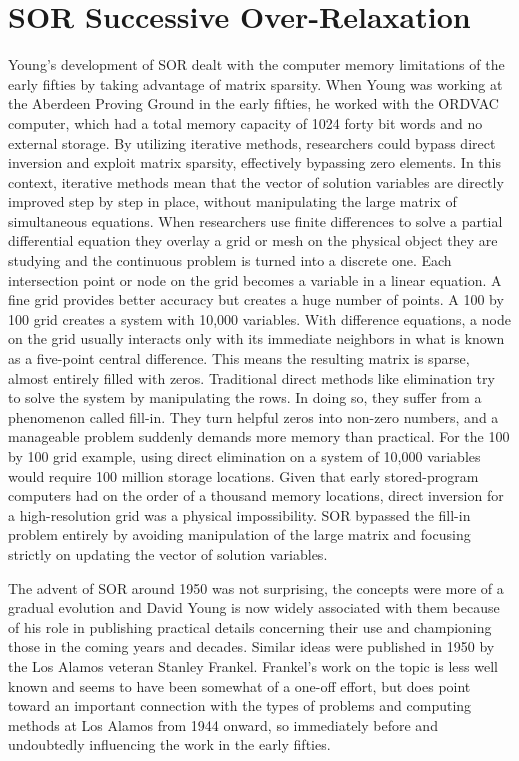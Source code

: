 \section{SOR Successive Over-Relaxation}

Young’s development of SOR dealt with the computer memory limitations of the early fifties by taking advantage of matrix sparsity. When Young was working at the Aberdeen Proving Ground in the early fifties, he worked with the ORDVAC computer, which had a total memory capacity of 1024 forty bit words and no external storage. By utilizing iterative methods, researchers could bypass direct inversion and exploit matrix sparsity, effectively bypassing zero elements. In this context, iterative methods mean that the vector of solution variables are directly improved step by step in place, without manipulating the large matrix of simultaneous equations. When researchers use finite differences to solve a partial differential equation they overlay a grid or mesh on the physical object they are studying and the continuous problem is turned into a discrete one. Each intersection point or node on the grid becomes a variable in a linear equation. A fine grid provides better accuracy but creates a huge number of points. A 100 by 100 grid creates a system with 10,000 variables. With difference equations, a node on the grid usually interacts only with its immediate neighbors in what is known as a five-point central difference. This means the resulting matrix is sparse, almost entirely filled with zeros. Traditional direct methods like elimination try to solve the system by manipulating the rows. In doing so, they suffer from a phenomenon called fill-in. They turn helpful zeros into non-zero numbers, and a manageable problem suddenly demands more memory than practical. For the 100 by 100 grid example, using direct elimination on a system of 10,000 variables would require 100 million storage locations. Given that early stored-program computers had on the order of a thousand memory locations, direct inversion for a high-resolution grid was a physical impossibility. SOR bypassed the fill-in problem entirely by avoiding manipulation of the large matrix and focusing strictly on updating the vector of solution variables. \cite{youngORDVACSolutionsDirichlet1955} \cite{forsytheComputerSolutionLinear1967}

The advent of SOR around 1950 was not surprising, the concepts were more of a gradual evolution and David Young is now widely associated with them because of his role in publishing practical details concerning their use and championing those in the coming years and decades. Similar ideas were published in 1950 by the Los Alamos veteran Stanley Frankel. Frankel's work on the topic is less well known and seems to have been somewhat of a one-off effort, but does point toward an important connection with the types of problems and computing methods at Los Alamos from 1944 onward, so immediately before and undoubtedly influencing the work in the early fifties. \cite{frankelConvergenceRatesIterative1950} \cite{youngIterativeMethodsSolving1950}

